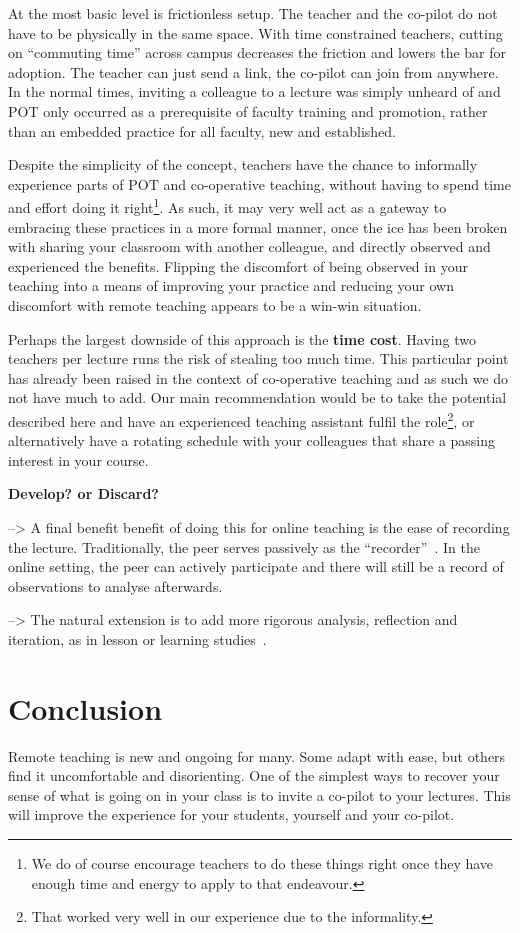 \documentclass[sigconf,natbib=false]{acmart}
\begin{document}
At the most basic level is frictionless setup. The teacher and the co-pilot do not have to be physically in the same space. With time constrained teachers, cutting on \enquote{commuting time} across campus decreases the friction and lowers the bar for adoption. The teacher can just send a link, the co-pilot can join from anywhere. In the normal times, inviting a colleague to a lecture was simply unheard of and POT only occurred as a prerequisite of faculty training and promotion, rather than an embedded practice for all faculty, new and established.

Despite the simplicity of the concept, teachers have the chance to informally experience parts of POT and co-operative teaching, without having to spend time and effort doing it right\footnote{We do of course encourage teachers to do these things right once they have enough time and energy to apply to that endeavour.}. As such, it may very well act as a gateway to embracing these practices in a more formal manner, once the ice has been broken with sharing your classroom with another colleague, and directly observed and experienced the benefits. Flipping the discomfort of being observed in your teaching into a means of improving your practice and reducing your own discomfort with remote teaching appears to be a win-win situation.

Perhaps the largest downside of this approach is the \textbf{time cost}. Having two teachers per lecture runs the risk of stealing too much time. This particular point has already been raised in the context of co-operative teaching and as such we do not have much to add. Our main recommendation would be to take the potential described here and have an experienced teaching assistant fulfil the role\footnote{That worked very well in our experience due to the informality.}, or alternatively have a rotating schedule with your colleagues that share a passing interest in your course.

\textbf{Develop? or Discard?}

--> A final benefit benefit of doing this for online teaching is the ease of recording the lecture. Traditionally, the peer serves passively as the \enquote{recorder}~\cite{xPeerObservation,xReflectivePeerObservation}. In the online setting, the peer can actively participate and there will still be a record of observations to analyse afterwards.

--> The natural extension is to add more rigorous analysis, reflection and iteration, as in lesson or learning studies~\cite{NecessaryConditionsOfLearning}.

\section*{Conclusion}

Remote teaching is new and ongoing for many. Some adapt with ease, but others find it uncomfortable and disorienting. One of the simplest ways to recover your sense of what is going on in your class is to invite a co-pilot to your lectures. This will improve the experience for your students, yourself and your co-pilot.

\printbibliography
\end{document}
